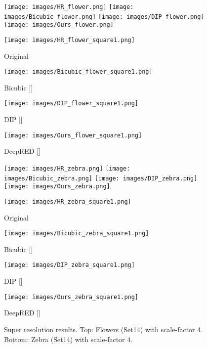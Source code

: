 \documentclass[12pt]{article}
\begin{document}
\begin{figure}[!ht]
\texttt{[image: images/HR\_flower.png]}
\endminipage
\hspace{0.01\textwidth}
  \texttt{[image: images/Bicubic\_flower.png]}
\endminipage\hfill
\hspace{0.01\textwidth}
  \texttt{[image: images/DIP\_flower.png]}
\endminipage\hfill
\hspace{0.01\textwidth}
  \texttt{[image: images/Ours\_flower.png]}
\endminipage\hfill

\texttt{[image: images/HR\_flower\_square1.png]}
  \caption*{Original}
\endminipage
\hspace{0.01\textwidth}
  \texttt{[image: images/Bicubic\_flower\_square1.png]}
  \caption*{Bicubic []}
\endminipage\hfill
\hspace{0.01\textwidth}
  \texttt{[image: images/DIP\_flower\_square1.png]}
  \caption*{DIP []}
\endminipage\hfill
\hspace{0.01\textwidth}
  \texttt{[image: images/Ours\_flower\_square1.png]}
  \caption*{DeepRED []}
\endminipage\hfill

\texttt{[image: images/HR\_zebra.png]}
\endminipage
\hspace{0.01\textwidth}
  \texttt{[image: images/Bicubic\_zebra.png]}
\endminipage\hfill
\hspace{0.01\textwidth}
  \texttt{[image: images/DIP\_zebra.png]}
\endminipage\hfill
\hspace{0.01\textwidth}
  \texttt{[image: images/Ours\_zebra.png]}
\endminipage\hfill

\texttt{[image: images/HR\_zebra\_square1.png]}
  \caption*{Original}
\endminipage
\hspace{0.01\textwidth}
  \texttt{[image: images/Bicubic\_zebra\_square1.png]}
  \caption*{Bicubic []}
\endminipage\hfill
\hspace{0.01\textwidth}
  \texttt{[image: images/DIP\_zebra\_square1.png]}
  \caption*{DIP []}
\endminipage\hfill
\hspace{0.01\textwidth}
  \texttt{[image: images/Ours\_zebra\_square1.png]}
  \caption*{DeepRED []}
\endminipage\hfill

\caption{Super resolution results. Top: \textsf{Flowers} (\textsf{Set14}) with scale-factor 4. Bottom: \textsf{Zebra} (\textsf{Set14}) with scale-factor 4.}
\label{fig:sr}
\end{figure}
\end{document}
